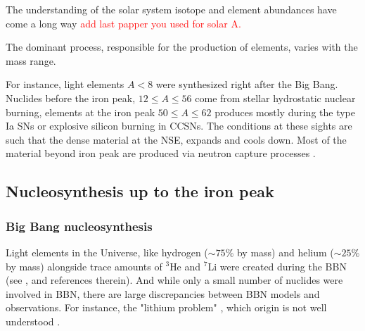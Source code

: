The understanding of the solar system isotope and element abundances  have come a long way \citep[\eg][]{Cameron:1973,Anders:1989,Grevesse:1998,Lodders:2003} 
\textcolor{red}{add last papper you used for solar A.}


The dominant \nuc{} process, responsible for the production of elements, varies with the mass range.

For instance, light elements $A<8$ were synthesized right after the Big Bang. Nuclides before the iron peak, $12\leq A\leq 56$ come from stellar hydrostatic nuclear burning, elements at the iron peak $50\leq A \leq 62$ produces mostly during the type Ia \acp{SN} or explosive silicon burning in \acp{CCSN}. The conditions at these sights are such that the dense material at the \ac{NSE}, expands and cools down. Most of the material beyond iron peak are produced via neutron capture processes \cite{Burbidge:1957}.



\subsection{Nucleosynthesis up to the iron peak}


\subsubsection{Big Bang nucleosynthesis}

Light elements in the Universe, like hydrogen ($\sim 75\%$ by mass) and helium ($\sim 25\%$ by mass) alongside trace amounts of $^{3}$He and $^{7}$Li were created during the \ac{BBN} (see \eg, \citet{Tytler:2000qf} and references therein). And while only a small number of nuclides were involved in \ac{BBN}, there are large discrepancies between \ac{BBN} models and observations. For instance, the "lithium problem" \citep{Coc:2013eha}, which origin is not well understood \citep{Fields:2011zzb}.


